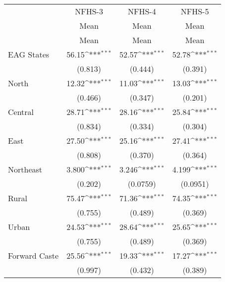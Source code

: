 {
\def\sym#1{\ifmmode^{#1}\else\(^{#1}\)\fi}
\begin{tabular}{l*{3}{c}}
\toprule
                    &      NFHS-3         &      NFHS-4         &      NFHS-5         \\
                    &\multicolumn{1}{c}{Mean}&\multicolumn{1}{c}{Mean}&\multicolumn{1}{c}{Mean}\\
                    &        Mean         &        Mean         &        Mean         \\
\midrule
EAG States          &       56.15\sym{***}&       52.57\sym{***}&       52.78\sym{***}\\
                    &     (0.813)         &     (0.444)         &     (0.391)         \\
\addlinespace
North               &       12.32\sym{***}&       11.03\sym{***}&       13.03\sym{***}\\
                    &     (0.466)         &     (0.347)         &     (0.201)         \\
\addlinespace
Central             &       28.71\sym{***}&       28.16\sym{***}&       25.84\sym{***}\\
                    &     (0.834)         &     (0.334)         &     (0.304)         \\
\addlinespace
East                &       27.50\sym{***}&       25.16\sym{***}&       27.41\sym{***}\\
                    &     (0.808)         &     (0.370)         &     (0.364)         \\
\addlinespace
Northeast           &       3.800\sym{***}&       3.246\sym{***}&       4.199\sym{***}\\
                    &     (0.202)         &    (0.0759)         &    (0.0951)         \\
\addlinespace
Rural               &       75.47\sym{***}&       71.36\sym{***}&       74.35\sym{***}\\
                    &     (0.755)         &     (0.489)         &     (0.369)         \\
\addlinespace
Urban               &       24.53\sym{***}&       28.64\sym{***}&       25.65\sym{***}\\
                    &     (0.755)         &     (0.489)         &     (0.369)         \\
\addlinespace
Forward Caste       &       25.56\sym{***}&       19.33\sym{***}&       17.27\sym{***}\\
                    &     (0.997)         &     (0.432)         &     (0.389)         \\

\end{tabular}}
